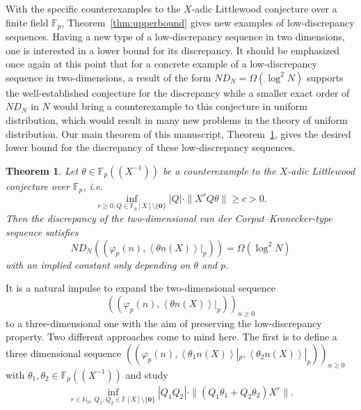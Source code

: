 \documentclass{article}
\newcommand{\NN}{\mathbb N}
\newcommand{\FF}{\mathbb{F}}
\renewcommand{\(}{\left (}
\renewcommand{\)}{\right )}
\newtheorem{theorem}{Theorem}[section]
\theoremstyle{definition}
\numberwithin{equation}{section}
\begin{document}
With the specific counterexamples to the $X$-adic Littlewood conjecture over a finite field $\FF_p$, Theorem~\ref{thm:upperbound} gives new examples of low-discrepancy sequences.  
Having a new type of a low-discrepancy sequence in two dimensions, one is interested in a lower bound for its discrepancy. It should be emphasized once again at this point that for a concrete example of a low-discrepancy sequence in two-dimensions, a result of the form $N D_N=\Omega(\log^2 N)$ supports the well-established conjecture for the discrepancy while a smaller exact order of $ND_N$ in $N$ would bring a counterexample to this conjecture in uniform distribution, which would result in many new problems in the theory of uniform distribution. 
Our main theorem of this manuscript, Theorem~\ref{thm:lowerbound}, gives the desired lower bound for the discrepancy of these low-discrepancy sequences. %

\begin{theorem}\label{thm:lowerbound}
Let $\theta\in\FF_p((X^{-1}))$ be a counterexample to the $X$-adic Littlewood conjecture over $\FF_p$, i.e. $$\inf_{r\geq 0,Q\in\FF_p[X]\setminus\{\boldsymbol{0}\}} |Q| \cdot\|X^rQ\theta\|\geq c>0.$$  Then the discrepancy of the two-dimensional van der Corput--Kronecker-type sequence satisfies $$N D_N((\varphi_p(n),{\left<  \theta n(X)\right>}|_p))=\Omega(\log^2 N)$$ with an implied constant only depending on $\theta$ and $p$. 
\end{theorem}

It is a natural impulse to expand the two-dimensional sequence $$((\varphi_p(n),{\left<  \theta n(X)\right>}|_p))_{n\geq 0}$$ to a three-dimensional one with the aim of preserving the low-discrepancy property. 
Two different approaches come to mind here. The first is to define a three dimensional sequence $((\varphi_p(n),{\left<  \theta_1 n(X)\right>}|_p,{\left<  \theta_2 n(X)\right>}|_p))_{n\geq 0}$ with $\theta_1,\theta_2 \in\FF_p((X^{-1}))$ and study 
\begin{align}\label{equ:3dim1}
	\inf_{r\in\NN_0,\,Q_1,Q_2\in\FF[X]\setminus\{\boldsymbol{0}\}} |Q_1Q_2| \cdot\|(Q_1\theta_1+Q_2\theta_2)X^r\|.
\end{align}
\end{document}
